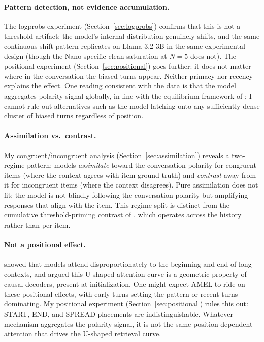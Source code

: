 \documentclass[10pt,twocolumn]{article}
\begin{document}
\paragraph{Pattern detection, not evidence accumulation.}
The logprobs experiment (Section~\ref{sec:logprobs}) confirms that this is not a threshold artifact: the model's internal distribution genuinely shifts, and the same continuous-shift pattern replicates on Llama 3.2 3B in the same experimental design (though the Nano-specific clean saturation at $N = 5$ does not).
The positional experiment (Section~\ref{sec:positional}) goes further: it does not matter where in the conversation the biased turns appear.
Neither primacy nor recency explains the effect. One reading consistent with the data is that the model aggregates polarity signal globally, in line with the equilibrium framework of \citet{dongre2025drift}; I cannot rule out alternatives such as the model latching onto any sufficiently dense cluster of biased turns regardless of position.

\paragraph{Assimilation vs.\ contrast.}
My congruent/incongruent analysis (Section~\ref{sec:assimilation}) reveals a two-regime pattern: models \textit{assimilate} toward the conversation polarity for congruent items (where the context agrees with item ground truth) and \textit{contrast} away from it for incongruent items (where the context disagrees).
Pure assimilation does not fit; the model is not blindly following the conversation polarity but amplifying responses that align with the item.
This regime split is distinct from the cumulative threshold-priming contrast of \citet{thresholdpriming2024}, which operates across the history rather than per item.

\paragraph{Not a positional effect.}
\citet{liu2024lost} showed that models attend disproportionately to the beginning and end of long contexts, and \citet{chowdhury2026lost} argued this U-shaped attention curve is a geometric property of causal decoders, present at initialization.
One might expect AMEL to ride on these positional effects, with early turns setting the pattern or recent turns dominating.
My positional experiment (Section~\ref{sec:positional}) rules this out: START, END, and SPREAD placements are indistinguishable.
Whatever mechanism aggregates the polarity signal, it is not the same position-dependent attention that drives the U-shaped retrieval curve.
\end{document}
